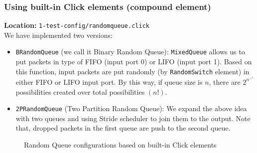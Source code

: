 \documentclass[a4paper]{article}
\begin{document}
  \subsubsection{Using built-in Click elements (compound element)}
  \textbf{Location:} \texttt{1-test-config/randomqueue.click} \\
  We have implemented two versions:
  \begin{itemize}
  	\item \texttt{BRandomQueue} (we call it Binary Random Queue): \texttt{MixedQueue} allows us to put packets in type of FIFO (input port 0) or LIFO (input port 1). Based on this function, input packets are put randomly (by \texttt{RandomSwitch} element) in either FIFO or LIFO input port. By this way, if queue size is $n$, there are $2^n^-^1$ possibilities created over total possibilities $(n!)$. %
  	\item \texttt{2PRandomQueue} (Two Partition Random Queue): We expand the above idea with two queues and using Stride scheduler to join them to the output. Note that, dropped packets in the first queue are push to the second queue.
  \end{itemize}
  \begin{figure}[ht]
      \centering
      
      
      \caption{Random Queue configurations based on built-in Click elements}
      \label{fig:clickrandomqueue}
  \end{figure}
\end{document}
